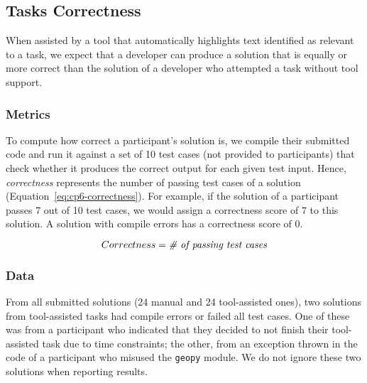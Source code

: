 
\subsection{Tasks Correctness}
\label{cp6:correctness}



When assisted by a tool that automatically highlights text identified as relevant to a task, we expect that a developer can produce a solution 
that is equally or more correct than the solution of a developer who attempted a task without tool support. 


\subsubsection{Metrics}

To compute how correct a participant's solution is, 
we compile their submitted code and run it against a set of 10 test cases (not provided to participants) that check whether it produces the correct output for each given test input. 
Hence, \textit{correctness} represents the number of passing test cases of a solution (Equation~\ref{eq:cp6-correctness}).
For example, if the solution of a participant passes 7 out of 10 test cases, we would assign a 
correctness score of $7$ to this solution. 
A solution with compile errors has a correctness score of $0$.


\begin{small}
\begin{equation}
    Correctness = \text{\textit{\# of passing test cases}}
    \label{eq:cp6-correctness}
\end{equation}
\end{small}



% 
\subsubsection{Data}

From all submitted solutions (24 manual and 24 tool-assisted ones), two 
solutions from tool-assisted tasks had compile errors or failed all test cases. 
One of these
was from a participant who indicated that they decided to not finish their tool-assisted task due to time constraints; 
the other, from an exception thrown in the code of a participant who misused the \texttt{geopy} module. We do not ignore these two solutions when reporting results.



